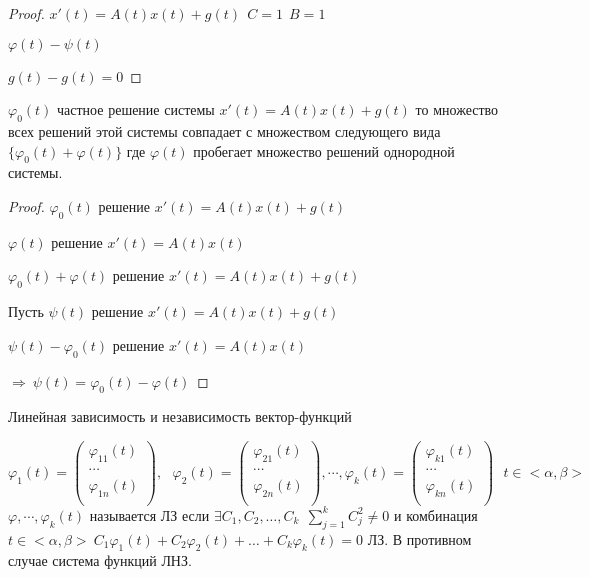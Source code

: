 \begin{proof}
  $x'(t) = A(t)x(t) + g(t) ~~ C = 1 ~~ B = 1$

  $\varphi(t) - \psi(t)$

  $g(t) - g(t) = 0$
\end{proof}

\begin{block}[Слeдствие 2]
  $\varphi_0(t)$ частное решение системы $x'(t) = A(t)x(t) + g(t)$ то
  множество всех решений этой системы совпадает с множеством следующего вида
  $\{\varphi_0(t) + \varphi(t)\}$ где $\varphi(t)$ пробегает множество решений
  однородной системы.
\end{block}

\begin{proof}
  $\varphi_0(t)$ решение $x'(t) = A(t)x(t) + g(t)$

  $\varphi(t)$ решение $x'(t) = A(t)x(t)$

  $\varphi_0(t) + \varphi(t)$ решение $x'(t) = A(t)x(t) + g(t)$

  Пусть $\psi(t)$ решение $x'(t) = A(t)x(t) + g(t)$

  $\psi(t) - \varphi_0(t)$ решение $x'(t) = A(t)x(t)$

  $\Rightarrow ~ \psi(t) = \varphi_0(t) - \varphi(t)$
\end{proof}

\begin{title}[\Large]
  Линейная зависимость и независимость вектор-функций
\end{title}

\begin{define}
  $$
  \varphi_1 (t) =
  \left(
  \begin{array}{c}
    \varphi_{11}(t) \\
    \cdots \\
    \varphi_{1n}(t) \\
  \end{array}
  \right),~~~
  \varphi_2 (t) =
  \left(
  \begin{array}{c}
    \varphi_{21}(t) \\
    \cdots \\
    \varphi_{2n}(t) \\
  \end{array}
  \right), \cdots,
  \varphi_k (t) =
  \left(
  \begin{array}{c}
    \varphi_{k1}(t) \\
    \cdots \\
    \varphi_{kn}(t) \\
  \end{array}
  \right) ~~~ t \in <\alpha, \beta>
  $$
  $\varphi, \cdots, \varphi_k(t)$ называется ЛЗ если $\exists C_1, C_2, \ldots,
  C_k ~~ \sum_{j=1}^k C_j^2 \not= 0$ и комбинация $t \in <\alpha, \beta> ~
  C_1\varphi_1(t) + C_2\varphi_2(t) + \ldots + C_k\varphi_k(t) = 0$ ЛЗ. В
  противном случае система функций ЛНЗ.
\end{define}

